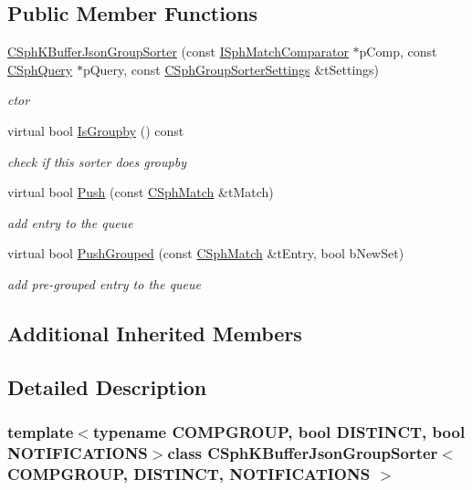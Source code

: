 \subsection*{Public Member Functions}
\begin{DoxyCompactItemize}
\item 
\hyperlink{classCSphKBufferJsonGroupSorter_a0eb438bc4050e57260575d83f193eb87}{C\-Sph\-K\-Buffer\-Json\-Group\-Sorter} (const \hyperlink{structISphMatchComparator}{I\-Sph\-Match\-Comparator} $\ast$p\-Comp, const \hyperlink{classCSphQuery}{C\-Sph\-Query} $\ast$p\-Query, const \hyperlink{structCSphGroupSorterSettings}{C\-Sph\-Group\-Sorter\-Settings} \&t\-Settings)
\begin{DoxyCompactList}\small\item\em ctor \end{DoxyCompactList}\item 
virtual bool \hyperlink{classCSphKBufferJsonGroupSorter_ab27bc17ca4a38da9248419445d052bd8}{Is\-Groupby} () const 
\begin{DoxyCompactList}\small\item\em check if this sorter does groupby \end{DoxyCompactList}\item 
virtual bool \hyperlink{classCSphKBufferJsonGroupSorter_a2b5a20314786b1217ef1d6ff56382f88}{Push} (const \hyperlink{classCSphMatch}{C\-Sph\-Match} \&t\-Match)
\begin{DoxyCompactList}\small\item\em add entry to the queue \end{DoxyCompactList}\item 
virtual bool \hyperlink{classCSphKBufferJsonGroupSorter_ad1d6be5f18585ecf87ccd505ea866e05}{Push\-Grouped} (const \hyperlink{classCSphMatch}{C\-Sph\-Match} \&t\-Entry, bool b\-New\-Set)
\begin{DoxyCompactList}\small\item\em add pre-\/grouped entry to the queue \end{DoxyCompactList}\end{DoxyCompactItemize}
\subsection*{Additional Inherited Members}


\subsection{Detailed Description}
\subsubsection*{template$<$typename C\-O\-M\-P\-G\-R\-O\-U\-P, bool D\-I\-S\-T\-I\-N\-C\-T, bool N\-O\-T\-I\-F\-I\-C\-A\-T\-I\-O\-N\-S$>$class C\-Sph\-K\-Buffer\-Json\-Group\-Sorter$<$ C\-O\-M\-P\-G\-R\-O\-U\-P, D\-I\-S\-T\-I\-N\-C\-T, N\-O\-T\-I\-F\-I\-C\-A\-T\-I\-O\-N\-S $>$}

